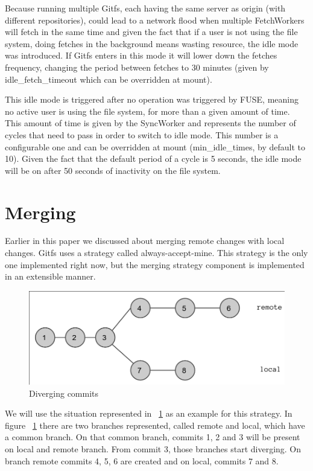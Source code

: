 Because running multiple Gitfs, each having the same server as origin (with different repositories), could lead to a network flood when multiple FetchWorkers will fetch in the same time and given the fact that if a user is not using the file system, doing fetches in the background means wasting resource, the idle mode was introduced. If Gitfs enters in this mode it will lower down the fetches frequency, changing the period between fetches to 30 minutes (given by idle\_fetch\_timeout which can be overridden at mount).

This idle mode is triggered after no operation was triggered by FUSE, meaning no active user is using the file system, for more than a given amount of time. This amount of time is given by the SyncWorker and represents the number of cycles that need to pass in order to switch to idle mode. This number is a configurable one and can be overridden at mount (min\_idle\_times, by default to 10). Given the fact that the default period of a cycle is 5 seconds, the idle mode will be on after 50 seconds of inactivity on the file system.

\section{Merging}

Earlier in this paper we discussed about merging remote changes with local changes. Gitfs uses a strategy called always-accept-mine. This strategy is the only one implemented right now, but the merging strategy component is implemented in an extensible manner.

\begin{figure}[h]
  \begin{center}
    \includegraphics[width=16cm]{layout/commits.png}
  \end{center}
  \caption{Diverging commits}
  \label{fig:commits}
\end{figure}

We will use the situation represented in ~\ref{fig:commits} as an example for this strategy. In figure ~\ref{fig:commits} there are two branches represented, called remote and local, which have a common branch. On that common branch, commits 1, 2 and 3 will be present on local and remote branch. From commit 3, those branches start diverging. On branch remote commits 4, 5, 6 are created and on local, commits 7 and 8.

